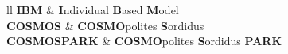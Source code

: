 
\begin{abbreviations}{ll} %
	\textbf{IBM} & \textbf{I}ndividual \textbf{B}ased \textbf{M}odel\\
	\textbf{COSMOS} & \textbf{COSMO}polites \textbf{S}ordidus\\
	\textbf{COSMOSPARK} & \textbf{COSMO}polites \textbf{S}ordidus \textbf{PARK}\\
	
	
\end{abbreviations}